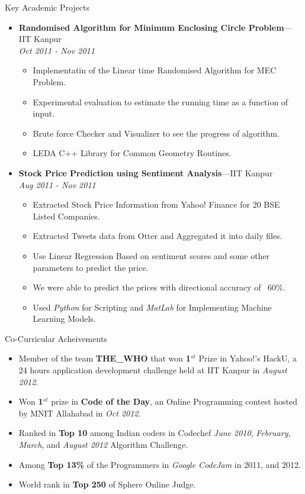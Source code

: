\documentclass[10pt]{article}
\newenvironment{ressection}[1]{
	\vspace{4pt}
	{\fontfamily{phv}\selectfont\Large#1}
	\begin{itemize}
	\vspace{3pt}
}{
	\end{itemize}
}
\newcommand{\resitem}[1]{
	\vspace{-4pt}
	\item \begin{flushleft} #1 \end{flushleft}
}
\newcommand{\ressubitem}[1]{
	\vspace{-1pt}
	\item \begin{flushleft} #1 \end{flushleft}
}
\newcommand{\resbigitem}[3]{
	\vspace{-5pt}
	\item
	\textbf{#1}---#2 \\
	\textit{#3}
}
\newenvironment{ressubsec}[3]{
	\resbigitem{#1}{#2}{#3}
	\vspace{-2pt}
	\begin{itemize}
}{
	\end{itemize}
}
\begin{document}
\begin{ressection}{Key Academic Projects}
  \begin{ressubsec}{Randomised Algorithm for Minimum Enclosing Circle Problem}{IIT Kanpur}{Oct 2011 - Nov 2011}
    \ressubitem{ Implementatin of the Linear time Randomised Algorithm for MEC Problem. }
    \ressubitem{ Experimental evaluation to estimate the running time as a function of input. }
    \ressubitem{ Brute force Checker and Visualizer to see the progress of algorithm. }
    \ressubitem{ LEDA C++ Library for Common Geometry Routines.}
  \end{ressubsec}

  \begin{ressubsec}{Stock Price Prediction using Sentiment Analysis}{IIT Kanpur}{Aug 2011 - Nov 2011}
    \ressubitem{ Extracted Stock Price Information from Yahoo! Finance for 20 BSE Listed Companies.}
    \ressubitem{ Extracted Tweets data from Otter and Aggregated it into daily files.  }
    \ressubitem{ Use Linear Regression Based on sentiment scores and some other parameters to predict the price.}
    \ressubitem{ We were able to predict the prices with directional accuracy of ~60\%.}
   \ressubitem{ Used \textit{Python} for Scripting and \textit{MatLab} for Implementing Machine Learning Models.}

  \end{ressubsec}


\end{ressection}


\begin{ressection}{Co-Curricular Acheivements}

\resitem{Member of the team \textbf{THE\_WHO} that won \textbf{1$^{st}$} Prize in Yahoo!'s HackU, a 24 hours application development challenge held at IIT Kanpur in \textit{August 2012}.}
\resitem{Won \textbf{1$^{st}$} prize in \textbf{Code of the Day}, an Online Programming contest hosted by MNIT Allahabad in \textit{Oct 2012}. }
\resitem{Ranked in \textbf{Top 10} among Indian coders in Codechef \textit{June 2010}, \textit{February}, \textit{March}, and \textit{August 2012} Algorithm Challenge.}

\resitem{Among \textbf{Top 13\%} of the Programmers in \textit{Google CodeJam} in 2011, and 2012.}
\resitem{World rank in \textbf{Top 250} of Sphere Online Judge.}

\end{ressection}
\end{document}
